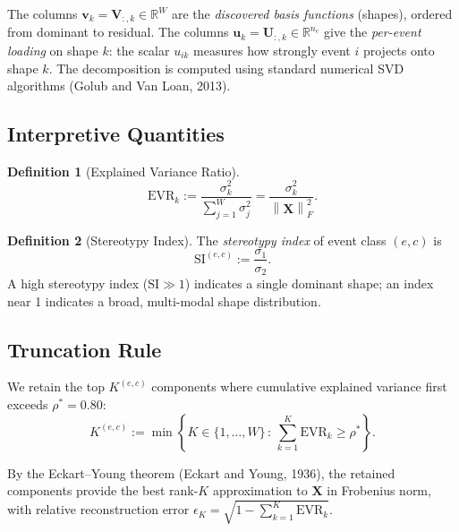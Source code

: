 \documentclass[11pt,a4paper]{article}
\theoremstyle{definition}
\newtheorem{definition}{Definition}[section]
\theoremstyle{plain}
\newcommand{\R}{\mathbb{R}}
\newcommand{\Xmat}{\mathbf{X}}
\newcommand{\Umat}{\mathbf{U}}
\newcommand{\Vmat}{\mathbf{V}}
\newcommand{\bvec}[1]{\mathbf{#1}}
\newcommand{\norm}[1]{\left\lVert #1 \right\rVert}
\begin{document}
The columns $\bvec{v}_k = \Vmat_{:,k} \in \R^W$ are the \emph{discovered
basis functions} (shapes), ordered from dominant to residual. The columns
$\bvec{u}_k = \Umat_{:,k} \in \R^{n_e}$ give the \emph{per-event loading}
on shape $k$: the scalar $u_{ik}$ measures how strongly event $i$ projects
onto shape $k$. The decomposition is computed using standard numerical SVD
algorithms (Golub and Van Loan, 2013).

\subsection{Interpretive Quantities}

\begin{definition}[Explained Variance Ratio]
\label{def:evr}
\begin{equation}
    \mathrm{EVR}_k :=
    \frac{\sigma_k^2}{\displaystyle\sum_{j=1}^{W} \sigma_j^2}
    = \frac{\sigma_k^2}{\norm{\Xmat}_F^2}.
    \label{eq:evr}
\end{equation}
\end{definition}

\begin{definition}[Stereotypy Index]
\label{def:stereotypy}
The \emph{stereotypy index} of event class $(e, c)$ is
\begin{equation}
    \mathrm{SI}^{(e,c)} := \frac{\sigma_1}{\sigma_2}.
    \label{eq:stereotypy}
\end{equation}
A high stereotypy index ($\mathrm{SI} \gg 1$) indicates a single dominant
shape; an index near 1 indicates a broad, multi-modal shape distribution.
\end{definition}

\subsection{Truncation Rule}

We retain the top $K^{(e,c)}$ components where cumulative explained
variance first exceeds $\rho^* = 0.80$:
\begin{equation}
    K^{(e,c)} :=
    \min\!\left\{
        K \in \{1, \ldots, W\} \,:\,
        \sum_{k=1}^{K} \mathrm{EVR}_k \geq \rho^*
    \right\}.
    \label{eq:truncation}
\end{equation}

By the Eckart--Young theorem (Eckart and Young, 1936), the retained
components provide the best rank-$K$ approximation to $\Xmat$ in Frobenius
norm, with relative reconstruction error
$\epsilon_K = \sqrt{1 - \sum_{k=1}^{K} \mathrm{EVR}_k}$.
\end{document}
